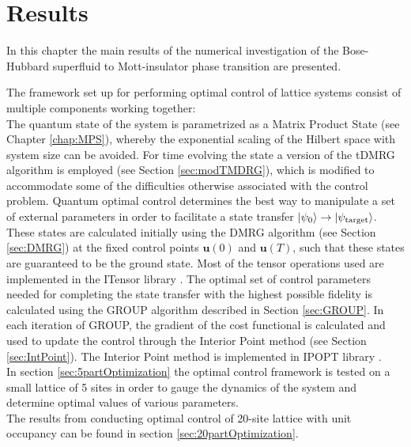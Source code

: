 \chapter{Results}

In this chapter the main results of the numerical investigation of the Bose-Hubbard superfluid to Mott-insulator phase transition are presented.

The framework set up for performing optimal control of lattice systems consist of multiple components working together:\\
The quantum state of the system is parametrized as a Matrix Product State (see Chapter \ref{chap:MPS}), whereby the exponential scaling of the Hilbert space with system size can be avoided. For time evolving the state a version of the tDMRG algorithm is employed (see Section \ref{sec:modTMDRG}), which is modified to accommodate some of the difficulties otherwise associated with the control problem.
Quantum optimal control determines the best way to manipulate a set of external parameters in order to facilitate a state transfer $\ket{\psi_0} \to \ket{\psi_{\mathrm{target}}}$. These states are calculated initially using the DMRG algorithm (see Section \ref{sec:DMRG}) at the fixed control points $\boldsymbol{u}(0)$ and $\boldsymbol{u}(T)$, such that these states are guaranteed to be the ground state. Most of the tensor operations used are implemented in the ITensor library \cite{ITensor}.
The optimal set of control parameters needed for completing the state transfer with the highest possible fidelity is calculated using the GROUP algorithm described in Section \ref{sec:GROUP}. In each iteration of GROUP, the gradient of the cost functional is calculated and used to update the control through the Interior Point method (see Section \ref{sec:IntPoint}). The Interior Point method is implemented in IPOPT library \cite{Wachter2006}.\\

In section \ref{sec:5partOptimization} the optimal control framework is tested on a small lattice of 5 sites in order to gauge the dynamics of the system and determine optimal values of various parameters.\\
The results from conducting optimal control of 20-site lattice with unit occupancy can be found in section \ref{sec:20partOptimization}. 



